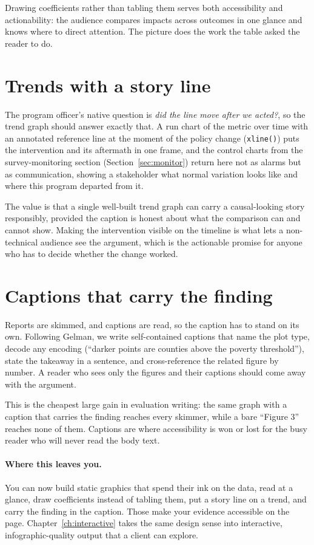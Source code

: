 \documentclass[
    a4paper,
    fontsize=10pt,
    twoside=true,
    numbers=noenddot,
]{kaobook}
\begin{document}
Drawing coefficients rather than tabling them serves both accessibility and actionability: the audience compares impacts across outcomes in one glance and knows where to direct attention. The picture does the work the table asked the reader to do.

\section{Trends with a story line}
The program officer's native question is \emph{did the line move after we acted?}, so the trend graph should answer exactly that. A run chart of the metric over time with an annotated reference line at the moment of the policy change (\texttt{xline()}) puts the intervention and its aftermath in one frame, and the control charts from the survey-monitoring section (Section~\ref{sec:monitor}) return here not as alarms but as communication, showing a stakeholder what normal variation looks like and where this program departed from it.

The value is that a single well-built trend graph can carry a causal-looking story responsibly, provided the caption is honest about what the comparison can and cannot show. Making the intervention visible on the timeline is what lets a non-technical audience see the argument, which is the actionable promise for anyone who has to decide whether the change worked.

\section{Captions that carry the finding}\label{sec:captions}
Reports are skimmed, and captions are read, so the caption has to stand on its own. Following Gelman, we write self-contained captions that name the plot type, decode any encoding (\enquote{darker points are counties above the poverty threshold}), state the takeaway in a sentence, and cross-reference the related figure by number. A reader who sees only the figures and their captions should come away with the argument.

This is the cheapest large gain in evaluation writing: the same graph with a caption that carries the finding reaches every skimmer, while a bare \enquote{Figure 3} reaches none of them. Captions are where accessibility is won or lost for the busy reader who will never read the body text.

\paragraph{Where this leaves you.} You can now build static graphics that spend their ink on the data, read at a glance, draw coefficients instead of tabling them, put a story line on a trend, and carry the finding in the caption. Those make your evidence accessible on the page. Chapter~\ref{ch:interactive} takes the same design sense into interactive, infographic-quality output that a client can explore.
\end{document}
